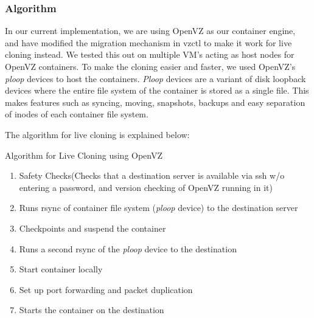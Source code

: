 

\subsubsection{Algorithm}


In our current implementation, we are using OpenVZ\cite{openvz} as our container engine, and have modified the migration mechanism in vzctl \cite{vzctl} to make it work for live cloning instead. 
We tested this out on multiple VM's acting as host nodes for OpenVZ containers. 
To make the cloning easier and faster, we used OpenVZ's \textit{ploop} devices \cite{ploop} to host the containers. 
\textit{Ploop} devices are a variant of disk loopback devices where the entire file system of the container is stored as a single file. 
This makes features such as syncing, moving, snapshots, backups and easy separation of inodes of each container file system.

The algorithm for live cloning is explained below: 

\begin{algorithm}[ht]
\begin{algorithmic}
   \caption{Algorithm for Live Cloning using OpenVZ 
   \label{algCloning}}
 \begin{enumerate}
   \item Safety Checks(Checks that a destination server is available via ssh w/o entering a password, and version checking of OpenVZ running in it) 
   \item Runs rsync of container file system (\textit{ploop} device) to the destination server  
   \item Checkpoints and suspend the container 
   \item Runs a second rsync of the \textit{ploop} device to the destination  
   \item Start container locally 
   \item Set up port forwarding and packet duplication
   \item Starts the container on the destination 
  \end{enumerate}
\end{algorithmic}
\end{algorithm}


